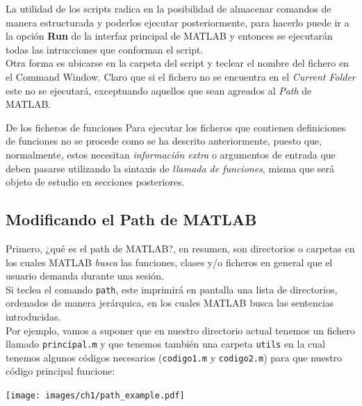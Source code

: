 La utilidad de los scripts radica en la posibilidad de almacenar
comandos de manera estructurada y poderlos ejecutar posteriormente, para
hacerlo puede ir a la opción \textbf{Run} de la interfaz principal de
MATLAB y entonces se ejecutarán todas las intrucciones que conforman el
script.\\

Otra forma es ubicarse en la carpeta del script y teclear el nombre del
fichero en el Command Window. Claro que si el fichero no se encuentra en
el \emph{Current Folder} este no se ejecutará, exceptuando aquellos que
sean agreados al \emph{Path} de MATLAB. \\

\begin{informacion}{De los ficheros de funciones}
Para ejecutar los ficheros que contienen
definiciones de funciones no se procede como se ha
descrito anteriormente, puesto que, normalmente, estos 
necesitan \emph{información extra} o argumentos de entrada que deben
pasarse utilizando la sintaxis de \emph{llamada de
funciones}, misma que será objeto de estudio en
secciones posteriores.
\end{informacion}

\subsection{Modificando el Path de MATLAB}\label{modificando-el-path-de-matlab}

Primero, ¿qué es el path de MATLAB?, en resumen, son directorios o
carpetas en los cuales MATLAB \emph{busca} las funciones, clases y/o
ficheros en general que el usuario demanda durante una sesión.\\

Si teclea el comando \texttt{path}, este imprimirá en pantalla una lista
de directorios, ordenados de manera jerárquica, en los cuales MATLAB
busca las sentencias introducidas.\\

Por ejemplo, vamos a suponer que en nuestro directorio actual tenemos un
fichero llamado \texttt{principal.m} y que tenemos también una carpeta
\texttt{utils} en la cual tenemos algunos códigos necesarios
(\texttt{codigo1.m} y \texttt{codigo2.m}) para que nuestro código
principal funcione:

\begin{center}
\texttt{[image: images/ch1/path\_example.pdf]}
\end{center}


